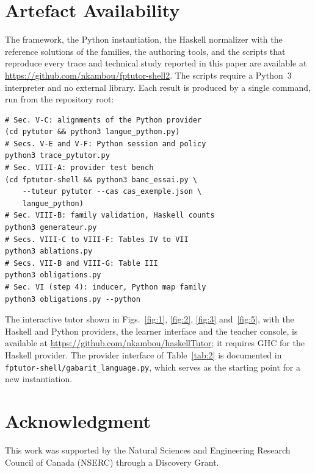 \documentclass[journal]{IEEEtran}
\begin{document}
\section{Artefact Availability}\label{sec:12}
The framework, the Python instantiation, the Haskell normalizer with the
reference solutions of the families, the authoring tools, and the scripts
that reproduce every trace and technical study reported in this paper are
available at \url{https://github.com/nkambou/fptutor-shell2}. The scripts
require a Python~3 interpreter and no external library. Each result is
produced by a single command, run from the repository root:
\begin{verbatim}
# Sec. V-C: alignments of the Python provider
(cd pytutor && python3 langue_python.py)
# Secs. V-E and V-F: Python session and policy
python3 trace_pytutor.py
# Sec. VIII-A: provider test bench
(cd fptutor-shell && python3 banc_essai.py \
    --tuteur pytutor --cas cas_exemple.json \
    langue_python)
# Sec. VIII-B: family validation, Haskell counts
python3 generateur.py
# Secs. VIII-C to VIII-F: Tables IV to VII
python3 ablations.py
# Secs. VII-B and VIII-G: Table III
python3 obligations.py
# Sec. VI (step 4): inducer, Python map family
python3 obligations.py --python
\end{verbatim}
The interactive tutor shown in Figs.~\ref{fig:1}, \ref{fig:2}, \ref{fig:3} and~\ref{fig:5}, with the Haskell and
Python providers, the learner interface and the teacher console, is
available at \url{https://github.com/nkambou/haskellTutor}; it requires
GHC for the Haskell provider. The provider interface of Table~\ref{tab:2} is
documented in
\texttt{fptutor-shell/gabarit\_language.py}, which serves as the starting
point for a new instantiation.

\section*{Acknowledgment}
This work was supported by the Natural Sciences and Engineering Research
Council of Canada (NSERC) through a Discovery Grant.
\end{document}
